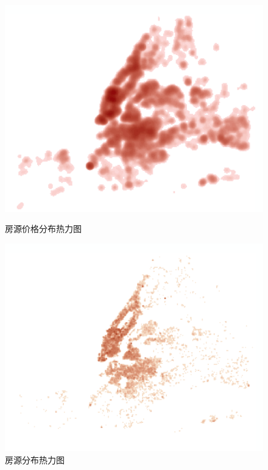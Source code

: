 \documentclass[12pt]{article}
\begin{document}
\begin{CJK}{UTF8}{gbsn}
	\begin{figure}[H]
		\begin{minipage}[b]{0.45\textwidth}
			\centering
			\includegraphics[width=\linewidth]{pic/13.png}
			\caption{房源价格分布热力图}
			\label{fig:13}
		\end{minipage}
		\hfill
		\begin{minipage}[b]{0.45\textwidth}
			\centering
			\includegraphics[width=\linewidth]{pic/14.png}
			\caption{房源分布热力图}
			\label{fig:14}
		\end{minipage}
	\end{figure}
	

\end{CJK}
\end{document}
